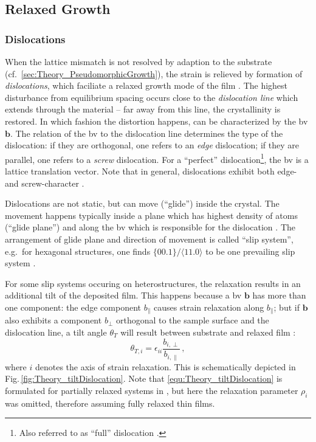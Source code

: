 \subsection{Relaxed Growth}
\label{Sec:Theory_Relaxed}
\subsubsection{Dislocations}
When the lattice mismatch is not resolved by adaption to the substrate (cf.~\ref{sec:Theory_PseudomorphicGrowth}), the strain is relieved by formation of \emph{dislocations}, which faciliate a relaxed growth mode of the film
    \cite{kneiss2021}.
The highest disturbance from equilibrium spacing occurs close to the \emph{dislocation line} which extends through the material --
far away from this line, the crystallinity is restored.
In which fashion the distortion happens, can be characterized by the \gls{bv} $\mathbf{b}$.
The relation of the \gls{bv} to the dislocation line determines the type of the dislocation:
    if they are orthogonal, one refers to an \emph{edge} dislocation;
    if they are parallel, one refers to a \emph{screw} dislocation.
For a \enquote{perfect} dislocation\footnote{
    Also referred to as \enquote{full} dislocation \cite{grundmann2016}.
}, the \gls{bv} is a lattice translation vector.
Note that in general, dislocations exhibit both edge- and screw-character
    \cite{hull2011}.

Dislocations are not static, but can move (\enquote{glide}) inside the crystal.
The movement happens typically inside a plane which has highest density of atoms (\enquote{glide plane}) and along the \gls{bv} which is responsible for the dislocation
    \cite{hull2011}.
The arrangement of glide plane and direction of movement is called \enquote{slip system}, e.g.\ for hexagonal structures, one finds $\{00.1\}/\langle11.0\rangle$ to be one prevailing slip system
    \cite{hull2011}.

For some slip systems occuring on heterostructures, the relaxation results in an additional tilt of the deposited film.
This happens because a \gls{bv} $\textbf{b}$ has more than one component:
the edge component $b_\parallel$ causes strain relaxation along $b_\parallel$;
but if $\mathbf{b}$ also exhibits a component $b_\perp$ orthogonal to the sample surface and the dislocation line, a tilt angle $\theta_T$ will result between substrate and relaxed film \cite{kneiss2021,grundmann2020b}:
\begin{equation}\label{equ:Theory_tiltDislocation}
    \theta_{T,i}=\epsilon_{ii}\frac{b_{i,\perp}}{b_{i,\parallel}}\,,
\end{equation}
where $i$ denotes the axis of strain relaxation.
This is schematically depicted in Fig.\,\ref{fig:Theory_tiltDislocation}.
Note that \eqref{equ:Theory_tiltDislocation} is formulated for partially relaxed systems in \textcite{kneiss2021}, but here the relaxation parameter $\rho_i$ was omitted, therefore assuming fully relaxed thin films. 

